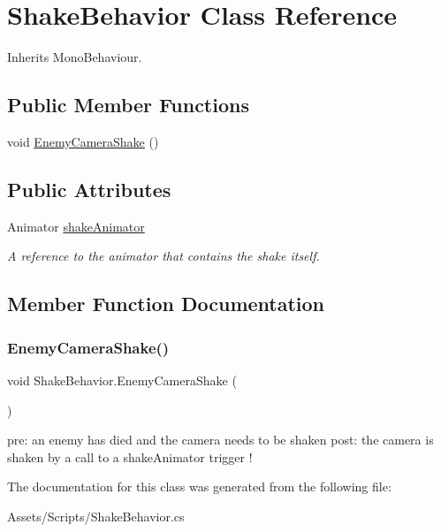 \hypertarget{class_shake_behavior}{}\section{Shake\+Behavior Class Reference}
\label{class_shake_behavior}


Inherits Mono\+Behaviour.

\subsection*{Public Member Functions}
\begin{DoxyCompactItemize}
\item 
void \mbox{\hyperlink{class_shake_behavior_aa7d0f4a5ab0a8f566ce5203fe9f4b229}{Enemy\+Camera\+Shake}} ()
\end{DoxyCompactItemize}
\subsection*{Public Attributes}
\begin{DoxyCompactItemize}
\item 
\mbox{\label{class_shake_behavior_aae508c1977572a978bd931512057da10}} 
Animator \mbox{\hyperlink{class_shake_behavior_aae508c1977572a978bd931512057da10}{shake\+Animator}}
\begin{DoxyCompactList}\small\item\em A reference to the animator that contains the shake itself. \end{DoxyCompactList}\end{DoxyCompactItemize}


\subsection{Member Function Documentation}
\mbox{\label{class_shake_behavior_aa7d0f4a5ab0a8f566ce5203fe9f4b229}} 
\subsubsection{\texorpdfstring{EnemyCameraShake()}{EnemyCameraShake()}}
{\footnotesize\ttfamily void Shake\+Behavior.\+Enemy\+Camera\+Shake (\begin{DoxyParamCaption}{ }\end{DoxyParamCaption})}

pre\+: an enemy has died and the camera needs to be shaken post\+: the camera is shaken by a call to a shake\+Animator trigger ! 

The documentation for this class was generated from the following file\+:\begin{DoxyCompactItemize}
\item 
Assets/\+Scripts/Shake\+Behavior.\+cs\end{DoxyCompactItemize}
